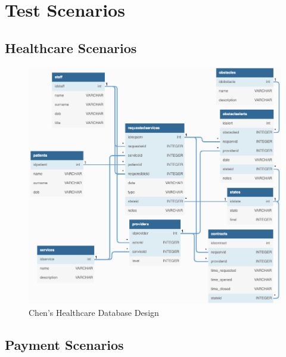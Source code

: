 \section{Test Scenarios}
\subsection{Healthcare Scenarios}
\begin{figure}[ht]
    \centering
    \includegraphics[width=\textwidth]{overleaf/images/chens_healthcare_db_design.png}
    \caption{Chen's Healthcare Database Design}
    \label{fig:chens_healthcare_db_design}
\end{figure}

\subsection{Payment Scenarios}

